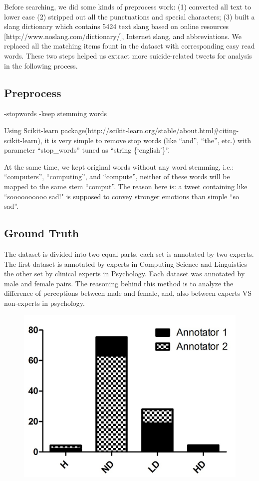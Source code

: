 \documentclass[11pt]{article}
\begin{document}
Before searching, we did some kinds of preprocess work:  (1) converted all text to lower case (2) stripped out all the punctuations and special characters; (3) built a slang dictionary which contains 5424 text slang based on online resources [http://www.noslang.com/dictionary/], Internet slang, and abbreviations. We replaced all the matching items fount in the dataset with corresponding easy read words. These two steps helped us extract more suicide-related tweets for analysis in the following process.


\subsection{Preprocess}
-stopwords
-keep stemming words

Using Scikit-learn package(http://scikit-learn.org/stable/about.html\#citing-scikit-learn), it is very simple to remove stop words (like ``and'', ``the'', etc.) with parameter ``stop\_words'' tuned as ``string \{`english'\}''. 

At the same time, we kept original words without any word stemming, i.e.: ``computers'', ``computing'', and ``compute'', neither of these words will be mapped to the same stem ``comput''. The reason here is: a tweet containing like ``soooooooooo sad!" is supposed to convey stronger emotions than simple ``so sad''.

\subsection{Ground Truth}
The dataset is divided into two equal parts, each set is annotated by two experts. The first dataset is annotated by experts in Computing Science and Linguistics  the other set by clinical experts in Psychology. Each dataset was annotated by male and female pairs. The reasoning behind this method is to analyze the difference of perceptions between male and female, and, also between experts VS non-experts in psychology.

\begin{figure}
\centering
\includegraphics[scale=0.7]{ChrisCissi4cat.jpg}
\end{figure}
\end{document}

